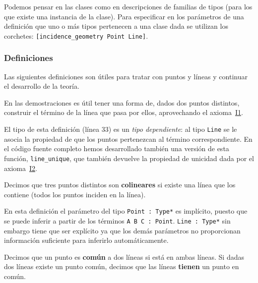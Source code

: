 Podemos pensar en las clases como en descripciones de familias de tipos (para
los que existe una instancia de la clase). Para especificar en los
parámetros de una definición que uno o más tipos pertenecen a una clase dada se
utilizan los corchetes: \lstinline{[incidence_geometry Point Line]}.

\subsubsection{Definiciones}

Las siguientes definiciones son útiles para tratar con puntos y líneas y
continuar el desarrollo de la teoría.

En las demostraciones es útil tener una forma de, dados dos puntos distintos,
construir el término de la línea que pasa por ellos, aprovechando el
axioma~\hyperref[ax:I1]{I1}.


El tipo de esta definición (línea 33) es un \textit{tipo dependiente}: al tipo
\lstinline{Line} se le asocia la propiedad de que los puntos pertenezcan al
término correspondiente. En el código fuente completo hemos desarrollado también
una versión de esta función, \lstinline{line_unique}, que también devuelve la
propiedad de unicidad dada por el axioma~\hyperref[ax:I2]{I2}.

\begin{defin*}[Colinearidad]
	Decimos que tres puntos distintos son \textbf{colineares} si existe una
	línea que los contiene (todos los puntos inciden en la línea).
\end{defin*}


En esta definición el parámetro del tipo \lstinline{Point : Type*} es implícito,
puesto que se puede inferir a partir de los términos \lstinline{A B C : Point}.
\lstinline{Line : Type*} sin embargo tiene que ser explícito ya que los demás
parámetros no proporcionan información suficiente para inferirlo
automáticamente.

\begin{defin*}
	Decimos que un punto es \textbf{común} a dos líneas si está en ambas líneas.
	Si dadas dos líneas existe un punto común, decimos que las líneas
	\textbf{tienen} un punto en común.
\end{defin*}


